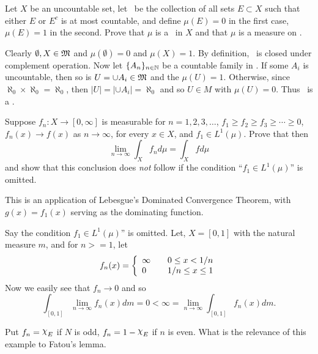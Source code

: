 \begin{enumerate}
\begin{excopy}
Let $X$ be an uncountable set, let \M\ be the collection of
all sets \(E\subset X\) such that either $E$ or \(E^c\)
is at most countable,
and define \(\mu(E)=0\) in the first case,
\(\mu(E)=1\) in the second.
Prove that \(\mu\) is a \salgebra\ in $X$ and that \(\mu\) is a measure on \M.
\end{excopy}

Clearly \(\emptyset, X\in \mathfrak{M}\) and
\(\mu(\emptyset) = 0\)
and \(\mu(X) = 1\).
By definition, \M\ is closed under complement operation.
Now let \(\{A_n\}_{n\in\mathbb{N}}\) be a countable family in \M.
If some \(A_i\) is uncountable, then so is \(U = \cup A_i\in \mathfrak{M}\)
and the \(\mu(U) = 1\).
Otherwise, since \(\aleph_0 \times \aleph_0 = \aleph_0\),
then \(|U| = |\cup A_i| = \aleph_0\) and so \(U\in M\) with \(\mu(U) = 0\).
Thus \M\ is a \salgebra.


\begin{excopy}
Suppose \(f_n:X\to[0,\infty]\) is measurable for \(n=1,2,3,\ldots\),
\(f_1 \geq f_2 \geq f_3 \geq \cdots \geq 0\),
\(f_n(x)\to f(x)\) as \(n\to\infty\), for every \(x\in X\),
and \(f_1\in L^1(\mu)\).
Prove that then
\begin{equation*}
 \lim_{n\to\infty}\int_X f_n d\mu = \int_X fd\mu
\end{equation*}
and show that this conclusion does \emph{not} follow if the condition
``\(f_1\in L^1(\mu)\)'' is omitted.
\end{excopy}

This is an application of Lebesgue's Dominated Convergence Theorem,
with \(g(x) = f_1(x)\) serving as the dominating function.

Say the condition \(f_1\in L^1(\mu)\)'' is omitted.
Let, \(X = [0,1]\) with the natural measure $m$, and for \(n>=1\), let
\begin{equation*}
f_n(x) = \left\{\begin{array}{l@{\qquad}l}
                \infty &  0\leq x<1/n \\
                0      &  1/n \leq x \leq 1
                \end{array}\right.
\end{equation*}
Now we easily see that \(f_n\to 0\) and so
\begin{equation*}
\int_{[0,1]} \lim_{n\to\infty} f_n(x)dm
= 0 < \infty
= \lim_{n\to\infty} \int_{[0,1]} f_n(x)dm.
\end{equation*}

\begin{excopy}
Put \(f_n = \chhi_E\) if $N$ is odd, \(f_n = 1 - \chhi_E\) if $n$ is even.
What is the relevance of this example
to Fatou's lemma.
\end{excopy}


\end{enumerate}

